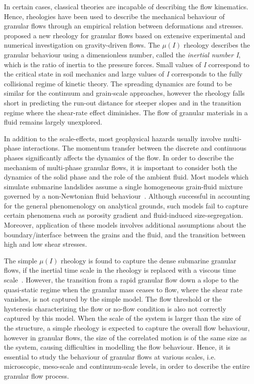 In certain cases, classical theories are incapable of describing the flow 
kinematics. Hence, rheologies have been used to describe the mechanical 
behaviour of granular flows through an empirical relation between deformations 
and stresses.~\citet{Midi2004} proposed a new rheology for granular flows based 
on extensive experimental and numerical investigation on gravity-driven flows. 
The $\mu(I)$ rheology describes the granular behaviour using a dimensionless 
number, called the \textit{inertial number I}, which is the ratio of inertia to 
the pressure forces. Small values of \textit{I} correspond to the critical 
state in soil mechanics and large values of \textit{I} corresponds to the fully 
collisional regime of kinetic theory. The spreading dynamics are found to be 
similar for the continuum and grain-scale approaches, however the rheology 
falls short in predicting the run-out distance for steeper slopes and in the 
transition regime where the shear-rate effect diminishes. The flow of granular 
materials in a fluid remains largely unexplored. 


In addition to the scale-effects, most geophysical hazards usually involve 
multi-phase interactions. The momentum transfer between the discrete and 
continuous phases significantly affects the dynamics of the flow. In order to 
describe the mechanism of multi-phase granular flows, it is important to 
consider both the dynamics of the solid phase and the role of the ambient 
fluid. Most models which simulate submarine landslides assume a single 
homogeneous grain-fluid mixture governed by a non-Newtonian fluid 
behaviour~\citep{Denlinger2001,Iverson2000}. Although successful in accounting 
for the general phenomenology on analytical grounds, such models fail to 
capture certain phenomena such as porosity gradient and fluid-induced 
size-segregation. Moreover, application of these models involves additional 
assumptions about the boundary/interface between the grains and the fluid, and 
the transition between high and low shear stresses. 

The simple $\mu(\textit{I})$ rheology is found to capture the dense submarine 
granular flows, if the inertial time scale in the rheology is replaced with a 
viscous time scale~\citep{Pouliquen2005}. However, the transition from a rapid 
granular flow down a slope to the quasi-static regime when the granular mass 
ceases to flow, where the shear rate vanishes, is not captured by the simple 
model. The flow threshold or the hysteresis characterizing the flow or no-flow 
condition is also not correctly captured by this model. When the scale of the 
system is larger than the size of the structure, a simple rheology is expected 
to capture the overall flow behaviour, however in granular flows, the size of 
the correlated motion is of the same size as the system, causing difficulties 
in modelling the flow behaviour. Hence, it is essential to study the behaviour 
of granular flows at various scales, i.e. microscopic, meso-scale and 
continuum-scale levels, in order to describe the entire granular flow process.


